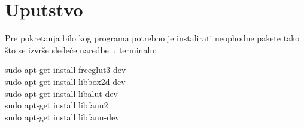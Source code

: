 \documentclass[a4paper]{article}
\begin{document}
 


\appendix
\section{Uputstvo}
\par Pre pokretanja bilo kog programa potrebno je instalirati neophodne pakete tako što se izvrše sledeće naredbe u terminalu:
\begin{tcolorbox}
sudo apt-get install freeglut3-dev\\
sudo apt-get install libbox2d-dev\\
sudo apt-get install libalut-dev \\
sudo apt-get install libfann2\\
sudo apt-get install libfann-dev
\end{tcolorbox}
\end{document}
